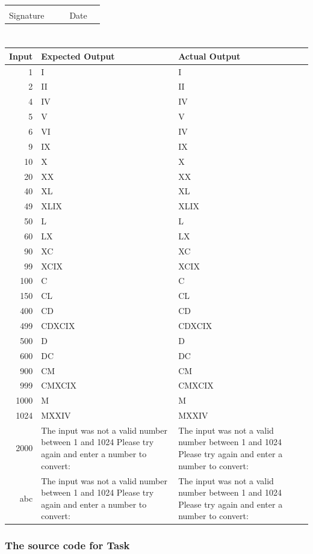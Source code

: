 \documentclass[12pt,a4paper,onesided]{report}
\renewcommand{\thesection}{Task \arabic{chapter}\alph{section}}
\newcommand{\source}{\pagebreak\subsection*{The source code for \thesection}}
\begin{document}
\vspace{5em}
\begin{table}[h]
	\centering
\begin{tabular}{lp{20ex}p{20ex}lp{20ex}}
	 & & &  & \\\cline{1-2} \cline{4-5}
	 Signature & & & Date &\\
\end{tabular}
\end{table}
\chapter{}
\vspace{-3em}
	\begin{tabular}{rp{36ex}p{36ex}}
		\toprule Input & Expected Output & Actual Output\\
		\midrule
		1 & I & I\\
		2 & II & II\\
		4 & IV & IV\\
		5 & V & V\\
		6 & VI & IV \\
		9 & IX & IX \\
		10 & X & X \\
		20 & XX & XX \\
		40 & XL & XL\\
		49 & XLIX & XLIX\\
		50 & L & L \\
		60 & LX & LX \\
		90 & XC & XC \\
		99 & XCIX & XCIX \\
		100 & C & C\\ 
		150 & CL & CL \\
		400 & CD & CD \\
		499 & CDXCIX & CDXCIX \\
		500 & D & D\\
		600 & DC & DC\\
		900 & CM & CM\\
		999 & CMXCIX & CMXCIX\\
		1000& M & M\\
		1024& MXXIV & MXXIV\\
		2000& The input was not a valid number between 1 and 1024 Please try again and enter a number to convert: &  The input was not a valid number between 1 and 1024 Please try again and enter a number to convert:\\
		abc& The input was not a valid number between 1 and 1024 Please try again and enter a number to convert: &  The input was not a valid number between 1 and 1024 Please try again and enter a number to convert:\\
				
		\bottomrule
				
	\end{tabular}
\source

\end{document}
